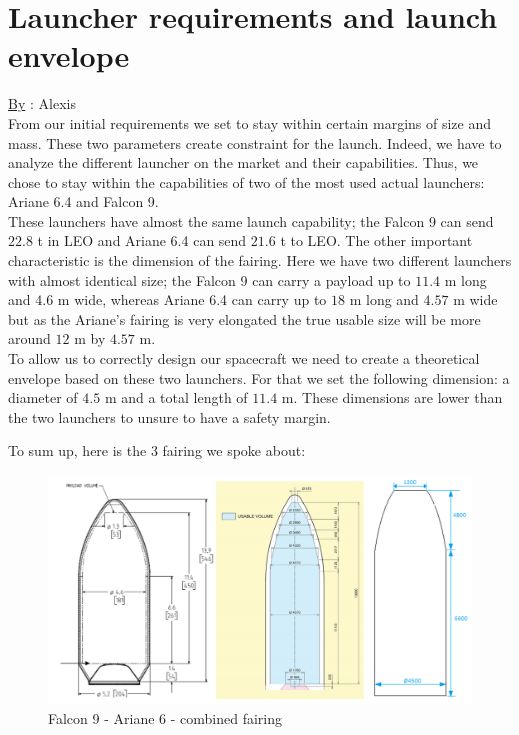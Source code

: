\chapter{Launcher requirements and launch envelope}
\qquad \underline{By} : Alexis\\

From our initial requirements we set to stay within certain margins of size and mass. These two parameters create constraint for the launch. 
Indeed, we have to analyze the different launcher on the market and their capabilities. 
Thus, we chose to stay within the capabilities of two of the most used actual launchers: Ariane 6.4 and Falcon 9. \\

These launchers have almost the same launch capability; the Falcon 9 can send $22.8$ t in LEO and Ariane 6.4 can send $21.6$ t to LEO.
The other important characteristic is the dimension of the fairing.
Here we have two different launchers with almost identical size; the Falcon 9 can carry a payload up to $11.4$ m long and $4.6$ m wide, whereas Ariane 6.4 can carry up to $18$ m long and $4.57$ m wide but as the Ariane's fairing is very elongated the true usable size will be more around $12$ m by $4.57$ m. \\

To allow us to correctly design our spacecraft we need to create a theoretical envelope based on these two launchers. For that we set the following dimension: a diameter of $4.5$ m and a total length of $11.4$ m. These dimensions are lower than the two launchers to unsure to have a safety margin.

\clearpage

To sum up, here is the 3 fairing we spoke about:

\begin{figure}[H]
    \centering
    \includegraphics[width=\linewidth]{enveloppe}
    \caption{Falcon 9 - Ariane 6 - combined fairing}
    \label{fig:my_label}
\end{figure}

